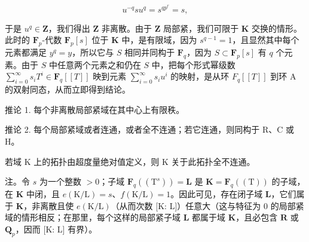 \[
u ^ {- q} s u ^ {q} = s ^ {q p ^ {r}} = s,
\]

于是 \(u^q \in \mathbf{Z}\)，我们得出 \(\mathbf{Z}\) 非离散。由于 \(\mathbf{Z}\) 局部紧，我们可限于 \(\mathbf{K}\) 交换的情形。此时的 \(\mathbf{F}_p\)-代数 \(\mathbf{F}_p[s]\) 位于 \(\mathbf{K}\) 中，是有限域，因为 \(s^{q-1} = 1\)，且显然其中每个元素都满足 \(y^q = y\)，所以它与 \(S\) 相同并同构于 \(\mathbf{F}_q\)，因为 \(S \subset \mathbf{F}_p[s]\) 有 \(q\) 个元素。由于 \(S\) 中任意两个元素之和仍在 \(S\) 中，把每个形式幂级数 \(\sum_{i=0}^{\infty} s_i T^i \in \mathbf{F}_q[[T]]\) 映到元素 \(\sum_{i=0}^{\infty}s_{i}u^{i}\) 的映射，是从环 \(F_{q}[[T]]\) 到环 A 的双射同态，从而立即得到结论。

推论 1. 每个非离散局部紧域在其中心上有限秩。

推论 2. 每个局部紧域或者连通，或者全不连通；若它连通，则同构于 R、C 或 H。

若域 K 上的拓扑由超度量绝对值定义，则 K 关于此拓扑全不连通。

注。令 \(s\) 为一个整数 \(>0\)；子域 \(\mathbf{F}_{q}((\mathrm{T}^{s})) = \mathbf{L}\) 是 \(\mathbf{K} = \mathbf{F}_{q}((\mathrm{T}))\) 的子域，在 \(\mathbf{K}\) 中闭，且 \(e(\mathrm{K/L}) = s\)、\(f(\mathrm{K/L}) = 1\)。因此可见，存在闭子域 \(\mathbf{L}\)，它们属于 \(\mathbf{K}\)，非离散且使 \(e(\mathrm{K/L})\)（从而次数 {[}K: L{]}）任意大（这与特征为 0 的局部紧域的情形相反；在那里，每个这样的局部紧子域 \(\mathbf{L}\) 都属于域 \(\mathbf{K}\)，且必包含 \(\mathbf{R}\) 或 \(\mathbf{Q}_{p}\)，因而 {[}K: L{]} 有界）。

